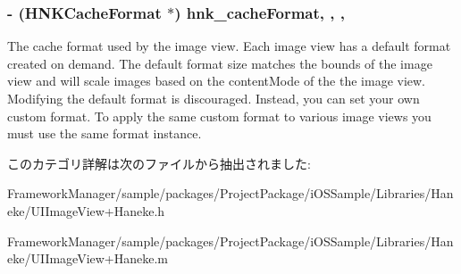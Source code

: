 \subsubsection[{hnk\+\_\+cache\+Format}]{\setlength{\rightskip}{0pt plus 5cm}-\/ ({\bf H\+N\+K\+Cache\+Format} $\ast$) hnk\+\_\+cache\+Format\hspace{0.3cm}{\ttfamily [read]}, {\ttfamily [write]}, {\ttfamily [nonatomic]}, {\ttfamily [strong]}}\label{category_u_i_image_view_07_haneke_08_ada173373a722ce388464d8c807d12a32}
The cache format used by the image view.  Each image view has a default format created on demand. The default format size matches the bounds of the image view and will scale images based on the content\+Mode of the the image view.  Modifying the default format is discouraged. Instead, you can set your own custom format. To apply the same custom format to various image views you must use the same format instance. 

このカテゴリ詳解は次のファイルから抽出されました\+:\begin{DoxyCompactItemize}
\item 
Framework\+Manager/sample/packages/\+Project\+Package/i\+O\+S\+Sample/\+Libraries/\+Haneke/U\+I\+Image\+View+\+Haneke.\+h\item 
Framework\+Manager/sample/packages/\+Project\+Package/i\+O\+S\+Sample/\+Libraries/\+Haneke/U\+I\+Image\+View+\+Haneke.\+m\end{DoxyCompactItemize}
